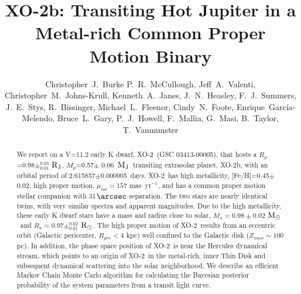 \documentclass{emulateapj}
\newcommand{\Msun}{${\rm M_\odot}$}
\newcommand{\Rsun}{${\rm R_\odot}$}
\newcommand{\Mjup}{${\rm M_J}$}
\newcommand{\xonb}{XO-2b}
\newcommand{\xon}{XO-2}
\newcommand{\Rjup}{${\rm R_J}$}
\newcommand{\vMs}{0.98}
\newcommand{\eMs}{0.02}
\newcommand{\vRs}{0.97}
\newcommand{\epRs}{0.02}
\newcommand{\enRs}{0.01}
\newcommand{\vperiod}{2.615857}
\newcommand{\eperiod}{0.000005}
\newcommand{\vMp}{0.57}
\newcommand{\eMp}{0.06}
\newcommand{\vRp}{0.98}
\newcommand{\epRp}{0.03}
\newcommand{\enRp}{0.01}
\newcommand{\vSepas}{31}
\newcommand{\vFeH}{0.45}
\newcommand{\eFeH}{0.02}
\begin{document}
\title{XO-2\lowercase{b}: Transiting Hot Jupiter in a Metal-rich Common Proper Motion Binary}

\author{
Christopher~J.~Burke
P.~R.~McCullough,
Jeff~A.~Valenti,
Christopher~M.~Johns-Krull,
Kenneth~A.~Janes,
J.~N.~Heasley,
F.~J.~Summers,
J.~E.~Stys,
R.~Bissinger,
Michael~L.~Fleenor,
Cindy~N.~Foote,
Enrique~Garc\'{i}a-Melendo,
Bruce~L.~Gary,
P.~J.~Howell,
F.~Mallia,
G.~Masi,
B.~Taylor,
T.~Vanmunster
}




\begin{abstract}
We report on a V=11.2 early K dwarf, \xon\ (GSC 03413-00005), that hosts a
$R_{p}$=\vRp$\pm^{\epRp}_{\enRp}$ \Rjup, $M_{p}$=\vMp$\pm$ \eMp\ \Mjup\
transiting extrasolar planet, \xonb, with an orbital period of
\vperiod$\pm$\eperiod\ days.  \xon\ has high metallicity,
[Fe/H]=\vFeH$\pm$\eFeH, high proper motion, $\mu_{tot}=157$
mas~yr$^{-1}$, and has a common proper motion stellar companion with
\vSepas $\arcsec$ separation.  The two stars are nearly identical
twins, with very similar spectra and apparent magnitudes.  Due to the
high metallicity, these early K dwarf stars have a mass and radius
close to solar, $M_{\star}=\vMs\pm
\eMs$ \Msun\ and $R_{\star}=\vRs\pm^{\epRs}_{\enRs}$ \Rsun .  The high
proper motion of \xon\ results from an eccentric orbit (Galactic
pericenter, $R_{per}<4$ kpc) well confined to the Galactic disk
($Z_{max}\sim 100$ pc).  In addition, the phase space position of \xon\
is near the Hercules dynamical stream, which points to an origin of
\xon\ in the metal-rich, inner Thin Disk and subsequent dynamical
scattering into the solar neighborhood.  We describe an efficient
Markov Chain Monte Carlo algorithm for calculating the Bayesian
posterior probability of the system parameters from a transit light
curve.
\end{abstract}
\end{document}
